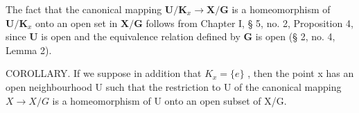 The fact that the canonical mapping \(\mathbf{U} / \mathbf{K}_x\to \mathbf{X} / \mathbf{G}\) is a homeomorphism of \(\mathbf{U} / \mathbf{K}_x\) onto an open set in \(\mathbf{X} / \mathbf{G}\) follows from Chapter I, § 5, no. 2, Proposition 4, since \(\mathbf{U}\) is open and the equivalence relation defined by \(\mathbf{G}\) is open (§ 2, no. 4, Lemma 2).

COROLLARY. If we suppose in addition that \(K_{x}=\{e\}\) , then the point x has an open neighbourhood U such that the restriction to U of the canonical mapping \(X\to X/G\) is a homeomorphism of U onto an open subset of X/G.

